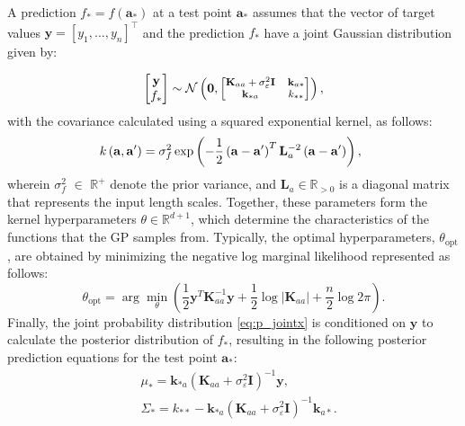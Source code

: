 A prediction \(f_* = f\left(\bm{a}_*\right)\) at a test point \(\bm{a}_*\) assumes that the vector of target values \(\bm{y} = [y_1, \dots, y_n]^\top\) and the prediction \(f_*\) have a joint Gaussian distribution given by:



\begin{equation}
	\begin{bmatrix}
		\bm{y} \\ f_*
	\end{bmatrix}
	\sim
	\mathcal{N}
	\left(\bm{0},
	\begin{footnotesize}\begin{bmatrix}
			\bm{K}_{aa}+\sigma^2_\varepsilon\bm{I} & \bm{k}_{a*} \\
			\bm{k}_{*a} & k_{**}
	\end{bmatrix}\end{footnotesize}\right),\label{eq:p_jointx}
\end{equation}
with the covariance calculated using a squared exponential kernel, as follows:
\begin{equation}
	\hspace{-1.9mm} k\left(\bm{a},\bm{a}'\right)= \sigma_f^2\exp\left(-\frac{1}{2}\left(\bm{a}-\bm{a}'\right)^T\bm{L}_a^{-2}\left(\bm{a}-\bm{a}'\right)\right),\label{kernal}
\end{equation}
wherein $\sigma_f^2$ $\in$ $\mathbb{R}^+$  denote the prior variance, and $\bm{L}_a\in\mathbb{R}_{>0}$ is a diagonal matrix that represents the input length scales. Together, these parameters form the kernel hyperparameters \(\theta \in \mathbb{R}^{d+1}\), which determine the  characteristics of the functions that the \ac{GP} samples from. Typically, the optimal hyperparameters, \(\theta_{\text{opt}}\), are obtained by minimizing the negative log marginal likelihood represented as follows: 
%
\begin{equation} \label{eq:hyper_opt}
    \theta_{\text{opt}} = \arg \min_{\theta} \left( \frac{1}{2} \mathbf{y}^T \bm{K}_{aa}^{-1} \mathbf{y} + \frac{1}{2} \log |\bm{K}_{aa}| + \frac{n}{2} \log 2\pi \right).
\end{equation}
%
Finally, the joint probability distribution \eqref{eq:p_jointx} is conditioned  on $\bm{y}$ to calculate the posterior distribution of $f_{*}$, resulting in the following posterior prediction equations for the test point $\bm{a}_*$:
\begin{align}
	&\mu_* = \bm{k}_{*a}\left(\bm{K}_{aa}+\sigma^2_\varepsilon\bm{I}\right)^{-1}\bm{y}, \label{eq:pred_dense2}\\
	&\Sigma_* = k_{**} - \bm{k}_{*a}\left(\bm{K}_{aa}+\sigma^2_\varepsilon\bm{I}\right)^{-1}\bm{k}_{a*}. \label{eq:pred_dense3}
\end{align}

